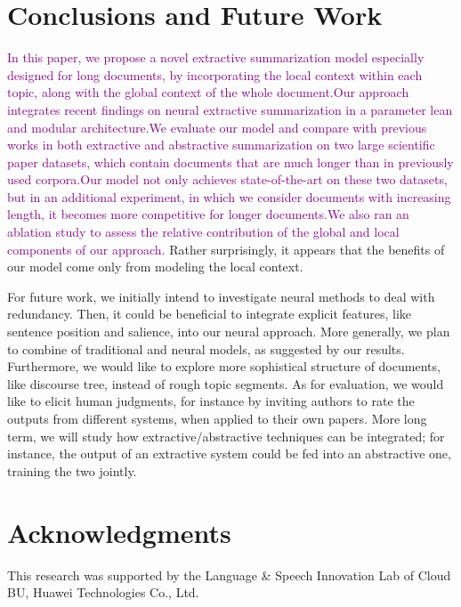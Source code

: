 \section{Conclusions and Future Work}
\renewcommand{\thefootnote}{\Roman{footnote}}
\textcolor{purple}{In this paper, we propose a novel extractive summarization model especially designed for long documents, by incorporating the local context within each topic, along with the global context of the whole document.}\footnotemark[2]  \textcolor{purple}{Our approach integrates recent findings on neural extractive summarization in a parameter lean and modular architecture.}\footnotemark[3]
\textcolor{purple}{We evaluate our model and compare with previous works in both extractive and abstractive summarization on two large scientific paper datasets,
which contain documents that are much longer than in previously used corpora.}\footnotemark[4] \textcolor{purple}{Our model not only achieves state-of-the-art on these two datasets, but in an additional experiment, in which we consider documents with increasing length, it becomes more competitive for longer documents.}\footnotemark[5]
\textcolor{purple}{We also ran an ablation study to assess the relative contribution of the global and local components of our approach. }\footnotemark[1]
Rather surprisingly, it appears that the benefits of our model come only from modeling the local context.

For future work, we initially intend to investigate neural methods to deal with redundancy.
Then, it could be beneficial to integrate explicit features, like sentence position and salience, into our neural approach. More generally, we plan to combine of traditional and neural models, as suggested by our results. Furthermore, we would like to explore more sophistical structure of documents, like discourse tree, instead of rough topic segments. As for evaluation, we would like to elicit human judgments, for instance by inviting authors to rate the outputs from different systems, when applied to their own papers.
More long term, we will study how extractive/abstractive
techniques can be integrated; for instance, the output of an extractive system could be fed into an abstractive
one, training the two jointly. 

\section*{Acknowledgments}
This research was supported by the Language \& Speech Innovation Lab of Cloud BU, Huawei Technologies Co., Ltd.

